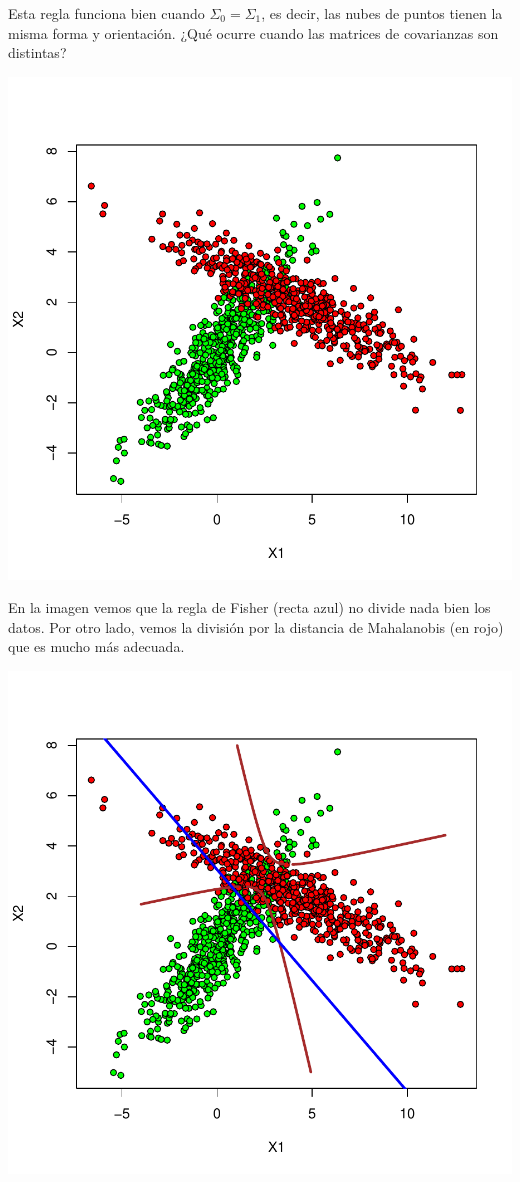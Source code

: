 \obs Esta regla funciona bien cuando $Σ_0 = Σ_1$, es decir, las nubes de puntos tienen la misma forma y orientación. ¿Qué ocurre cuando las matrices de covarianzas son distintas?

\begin{center}
\includegraphics[width=13 cm]{pdf/tema4/_sim-plot}
\end{center}

En la imagen vemos que la regla de Fisher (recta azul) no divide nada bien los datos. Por otro lado, vemos la división por la distancia de Mahalanobis (en rojo) que es mucho más adecuada.

\begin{center}
\includegraphics[width=13 cm]{pdf/tema4/_sim-plot-reglas}
\end{center}


